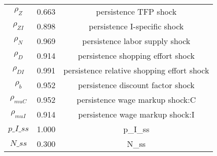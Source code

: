\begin{center}
\begin{longtable}{ccc}
${\rho_Z}$ 	 & 	 0.663 	 & 	 persistence TFP shock\\
${\rho_{ZI}}$ 	 & 	 0.898 	 & 	 persistence I-specific shock\\
${\rho_N}$ 	 & 	 0.969 	 & 	 persistence labor supply shock\\
${\rho_D}$ 	 & 	 0.914 	 & 	 persistence shopping effort shock\\
${\rho_{DI}}$ 	 & 	 0.991 	 & 	 persistence relative shopping effort shock\\
${\rho_b}$ 	 & 	 0.952 	 & 	 persistence discount factor shock\\
${\rho_{muC}}$ 	 & 	 0.952 	 & 	 persistence wage markup shock:C\\
${\rho_{muI}}$ 	 & 	 0.914 	 & 	 persistence wage markup shock:I\\
$p\_I\_ss$ 	 & 	 1.000 	 & 	 p\_I\_ss\\
$N\_ss$ 	 & 	 0.300 	 & 	 N\_ss\\
\bottomrule%
\end{longtable}
\end{center}
